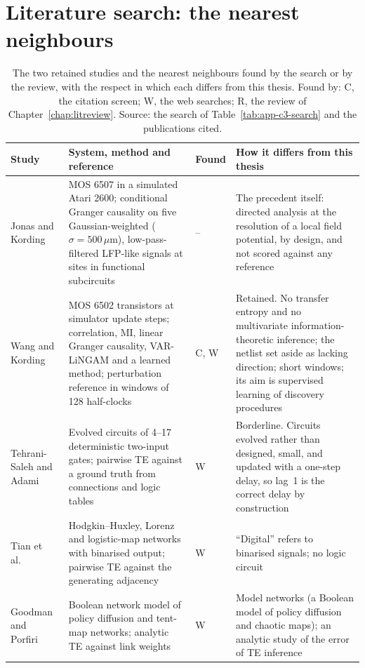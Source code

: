 \section{Literature search: the nearest neighbours}

\begin{table}[tbp]
\centering
\footnotesize
\caption[Nearest neighbours found by the literature search]{The two retained studies and the nearest neighbours found by the search or by the review, with the respect in which each differs from this thesis. Found by: C, the citation screen; W, the web searches; R, the review of Chapter~\ref{chap:litreview}. Source: the search of Table~\ref{tab:app-c3-search} and the publications cited.}
\label{tab:app-c3-neighbours}
\begin{tabular}{@{}L{0.2\textwidth}L{0.24\textwidth}L{0.055\textwidth}L{0.435\textwidth}@{}}
\toprule
Study & System, method and reference & Found & How it differs from this thesis \\
\midrule
Jonas and Kording~\cite{jonas2017microprocessor} & MOS 6507 in a simulated Atari 2600; conditional Granger causality on five Gaussian-weighted ($\sigma = 500\,\mu$m), low-pass-filtered LFP-like signals at sites in functional subcircuits & -- & The precedent itself: directed analysis at the resolution of a local field potential, by design, and not scored against any reference \\
Wang and Kording~\cite{wang2023learning} & MOS 6502 transistors at simulator update steps; correlation, MI, linear Granger causality, VAR-LiNGAM and a learned method; perturbation reference in windows of 128 half-clocks & C, W & Retained. No transfer entropy and no multivariate information-theoretic inference; the netlist set aside as lacking direction; short windows; its aim is supervised learning of discovery procedures \\
Tehrani-Saleh and Adami~\cite{tehranisaleh2020transfer} & Evolved circuits of 4--17 deterministic two-input gates; pairwise TE against a ground truth from connections and logic tables & W & Borderline. Circuits evolved rather than designed, small, and updated with a one-step delay, so lag~1 is the correct delay by construction \\
Tian et al.~\cite{tian2019digital} & Hodgkin--Huxley, Lorenz and logistic-map networks with binarised output; pairwise TE against the generating adjacency & W & ``Digital'' refers to binarised signals; no logic circuit \\
Goodman and Porfiri~\cite{goodman2020topological} & Boolean network model of policy diffusion and tent-map networks; analytic TE against link weights & W & Model networks (a Boolean model of policy diffusion and chaotic maps); an analytic study of the error of TE inference \\

\end{tabular}
\end{table}
